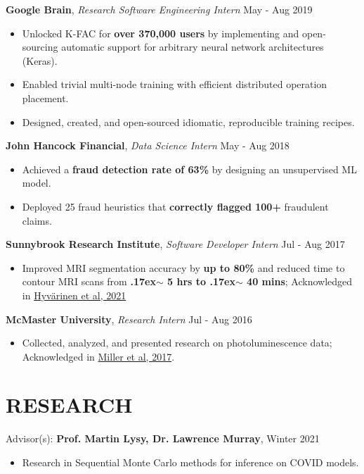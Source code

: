 \documentclass[line,margin]{res}
\newcommand{\experience}[3]{\textbf{#1}, \textit{#2} \hfill #3 \\ \vspace{-4mm}}
\newcommand{\ura}[3]{Advisor(s): \textbf{#1}, \textit{#2} \hfill #3 \\ \vspace{-4mm}}
\begin{document}
\begin{resume}
    \experience{Google Brain}{Research Software Engineering Intern}{May - Aug 2019}
    \begin{itemize}
        \item Unlocked K-FAC for \textbf{over 370,000 users} by implementing and open-sourcing automatic support for arbitrary neural network architectures (Keras).
        \item Enabled trivial multi-node training with efficient distributed operation placement.
        \item Designed, created, and open-sourced idiomatic, reproducible training recipes.
    \end{itemize}

    \experience{John Hancock Financial}{Data Science Intern}{May - Aug 2018}
    \begin{itemize}
        \item Achieved a \textbf{fraud detection rate of 63\%} by designing an unsupervised ML model.
        \item Deployed 25 fraud heuristics that \textbf{correctly flagged 100+} fraudulent claims.
    \end{itemize}

    \experience{Sunnybrook Research Institute}{Software Developer Intern}{Jul - Aug 2017}
    \begin{itemize}
        \item Improved MRI segmentation accuracy by \textbf{up to 80\%} and reduced time to contour MRI scans from \textbf{{\raise.17ex\hbox{$\scriptstyle\sim$}} 5 hrs to {\raise.17ex\hbox{$\scriptstyle\sim$}} 40 mins}; Acknowledged in \href{https://aapm.onlinelibrary.wiley.com/doi/epdf/10.1002/mp.15263}{Hyvärinen et al, 2021}
    \end{itemize}

    \experience{McMaster University}{Research Intern}{Jul - Aug 2016}
    \begin{itemize}
        \item Collected, analyzed, and presented research on photoluminescence data; Acknowledged in \href{https://www.bradleyresearchgroup.ca/publications.html#:~:text=J.%20W.%20Miller%2C%20D,Photonics%20North%2C%20paper%2015.20.}{Miller et al, 2017}.
    \end{itemize}

\section{RESEARCH}
    \ura{Prof. Martin Lysy, Dr. Lawrence Murray}{}{Winter 2021}
    \begin{itemize}
        \item Research in Sequential Monte Carlo methods for inference on COVID models.
    \end{itemize}
    \vspace{-2mm}


\end{resume}
\end{document}
